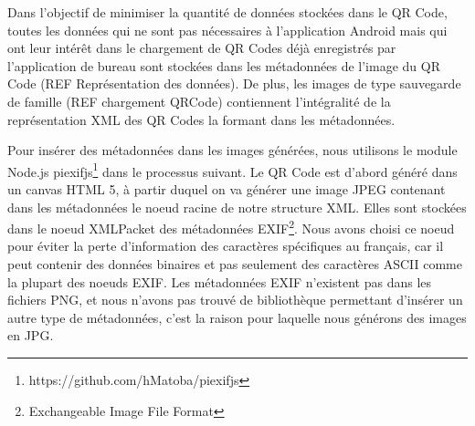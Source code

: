 \par
Dans l'objectif de minimiser la quantité de données stockées dans le QR Code, toutes les données qui ne sont pas nécessaires à l'application Android mais qui ont leur intérêt dans le chargement de QR Codes déjà enregistrés par l'application de bureau sont stockées dans les métadonnées de l'image du QR Code (REF Représentation des données). De plus, les images de type sauvegarde de famille (REF chargement QRCode) contiennent l'intégralité de la représentation XML des QR Codes la formant dans les métadonnées.\\
\par
Pour insérer des métadonnées dans les images générées, nous utilisons le module Node.js piexifjs\footnote{https://github.com/hMatoba/piexifjs} dans le processus suivant. Le QR Code est d'abord généré dans un canvas HTML 5, à partir duquel on va générer une image JPEG contenant dans les métadonnées le noeud racine de notre structure XML. Elles sont stockées dans le noeud XMLPacket des métadonnées EXIF\footnote{Exchangeable Image File Format}. Nous avons choisi ce noeud pour éviter la perte d'information des caractères spécifiques au français, car il peut contenir des données binaires et pas seulement des caractères ASCII comme la plupart des noeuds EXIF. Les métadonnées EXIF n'existent pas dans les fichiers PNG, et nous n'avons pas trouvé de bibliothèque permettant d'insérer un autre type de métadonnées, c'est la raison pour laquelle nous générons des images en JPG.